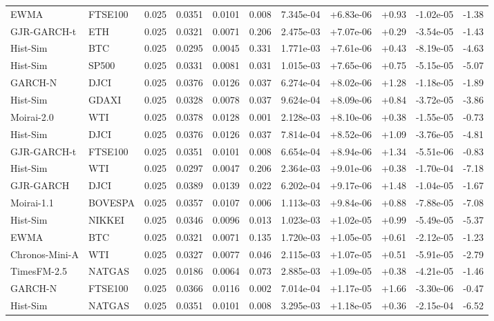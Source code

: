 \begin{tabular}{llrrrrrrrrr}
EWMA & FTSE100 & 0.025 & 0.0351 & 0.0101 & 0.008 & 7.345e-04 & +6.83e-06 & +0.93 & -1.02e-05 & -1.38 \\
GJR-GARCH-t & ETH & 0.025 & 0.0321 & 0.0071 & 0.206 & 2.475e-03 & +7.07e-06 & +0.29 & -3.54e-05 & -1.43 \\
Hist-Sim & BTC & 0.025 & 0.0295 & 0.0045 & 0.331 & 1.771e-03 & +7.61e-06 & +0.43 & -8.19e-05 & -4.63 \\
Hist-Sim & SP500 & 0.025 & 0.0331 & 0.0081 & 0.031 & 1.015e-03 & +7.65e-06 & +0.75 & -5.15e-05 & -5.07 \\
GARCH-N & DJCI & 0.025 & 0.0376 & 0.0126 & 0.037 & 6.274e-04 & +8.02e-06 & +1.28 & -1.18e-05 & -1.89 \\
Hist-Sim & GDAXI & 0.025 & 0.0328 & 0.0078 & 0.037 & 9.624e-04 & +8.09e-06 & +0.84 & -3.72e-05 & -3.86 \\
Moirai-2.0 & WTI & 0.025 & 0.0378 & 0.0128 & 0.001 & 2.128e-03 & +8.10e-06 & +0.38 & -1.55e-05 & -0.73 \\
Hist-Sim & DJCI & 0.025 & 0.0376 & 0.0126 & 0.037 & 7.814e-04 & +8.52e-06 & +1.09 & -3.76e-05 & -4.81 \\
GJR-GARCH-t & FTSE100 & 0.025 & 0.0351 & 0.0101 & 0.008 & 6.654e-04 & +8.94e-06 & +1.34 & -5.51e-06 & -0.83 \\
Hist-Sim & WTI & 0.025 & 0.0297 & 0.0047 & 0.206 & 2.364e-03 & +9.01e-06 & +0.38 & -1.70e-04 & -7.18 \\
GJR-GARCH & DJCI & 0.025 & 0.0389 & 0.0139 & 0.022 & 6.202e-04 & +9.17e-06 & +1.48 & -1.04e-05 & -1.67 \\
Moirai-1.1 & BOVESPA & 0.025 & 0.0357 & 0.0107 & 0.006 & 1.113e-03 & +9.84e-06 & +0.88 & -7.88e-05 & -7.08 \\
Hist-Sim & NIKKEI & 0.025 & 0.0346 & 0.0096 & 0.013 & 1.023e-03 & +1.02e-05 & +0.99 & -5.49e-05 & -5.37 \\
EWMA & BTC & 0.025 & 0.0321 & 0.0071 & 0.135 & 1.720e-03 & +1.05e-05 & +0.61 & -2.12e-05 & -1.23 \\
Chronos-Mini-A & WTI & 0.025 & 0.0327 & 0.0077 & 0.046 & 2.115e-03 & +1.07e-05 & +0.51 & -5.91e-05 & -2.79 \\
TimesFM-2.5 & NATGAS & 0.025 & 0.0186 & 0.0064 & 0.073 & 2.885e-03 & +1.09e-05 & +0.38 & -4.21e-05 & -1.46 \\
GARCH-N & FTSE100 & 0.025 & 0.0366 & 0.0116 & 0.002 & 7.014e-04 & +1.17e-05 & +1.66 & -3.30e-06 & -0.47 \\
Hist-Sim & NATGAS & 0.025 & 0.0351 & 0.0101 & 0.008 & 3.295e-03 & +1.18e-05 & +0.36 & -2.15e-04 & -6.52 \\

\end{tabular}
